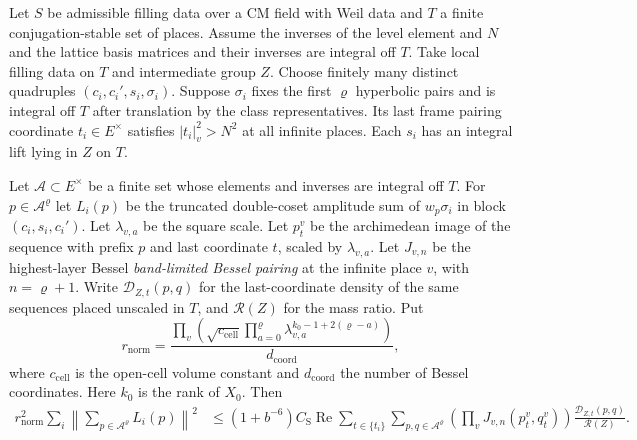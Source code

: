 \begin{lemma}
\label{lem:b-siegel-modal-sum}
\emitthmsource
Let $S$ be admissible filling data over a CM field with Weil data and $T$ a finite conjugation-stable set of places.
Assume the inverses of the level element and $N$ and the lattice basis matrices and their inverses are integral off $T$.
Take local filling data on $T$ and intermediate group $Z$.
Choose finitely many distinct quadruples $(c_i,c_i',s_i,\sigma_i)$.
Suppose $\sigma_i$ fixes the first $\varrho$ hyperbolic pairs and is integral off $T$ after translation by the class representatives.
Its last frame pairing coordinate $t_i\in E^\times$ satisfies $|t_i|_v^2>N^2$ at all infinite places.
Each $s_i$ has an integral lift lying in $Z$ on $T$.

Let $\mathcal A\subset E^\times$ be a finite set whose elements and inverses are integral off $T$.
For $p\in\mathcal A^\varrho$ let $L_i(p)$ be the truncated double-coset amplitude sum of $w_p\sigma_i$
in block $(c_i,s_i,c_i')$. Let $\lambda_{v,a}$ be the square scale.
Let $p^v_t$ be the archimedean image of the sequence with prefix $p$ and last coordinate $t$, scaled by $\lambda_{v,a}$.
Let $J_{v,n}$ be the highest-layer Bessel \emph{band-limited Bessel pairing} at the infinite place $v$, with $n=\varrho+1$.
Write $\mathcal D_{Z,t}(p,q)$ for the last-coordinate density of the same sequences placed unscaled in $T$,
and $\mathcal R(Z)$ for the mass ratio. Put
\[
 r_{\mathrm{norm}}=\frac{\displaystyle\prod_v\left(
     \sqrt{c_{\mathrm{cell}}}
      \prod_{a=0}^{\varrho}\lambda_{v,a}^{k_0-1+2(\varrho-a)}\right)}
                    {d_{\mathrm{coord}}},
\]
where $c_{\mathrm{cell}}$ is the open-cell volume constant and $d_{\mathrm{coord}}$ the number of Bessel coordinates.
Here $k_0$ is the rank of $X_0$. Then
\[
 \begin{aligned}
 r_{\mathrm{norm}}^2\sum_i\left\|\sum_{p\in\mathcal A^\varrho}L_i(p)\right\|^2
 &\le (1+b^{-6})C_{\mathrm S}
       \operatorname{Re}\sum_{t\in\{t_i\}}
            \sum_{p,q\in\mathcal A^\varrho}
          \left(\prod_v J_{v,n}(p^v_t,q^v_t)\right)
             \frac{\mathcal D_{Z,t}(p,q)}{\mathcal R(Z)} .
 \end{aligned}
\]
\end{lemma}
